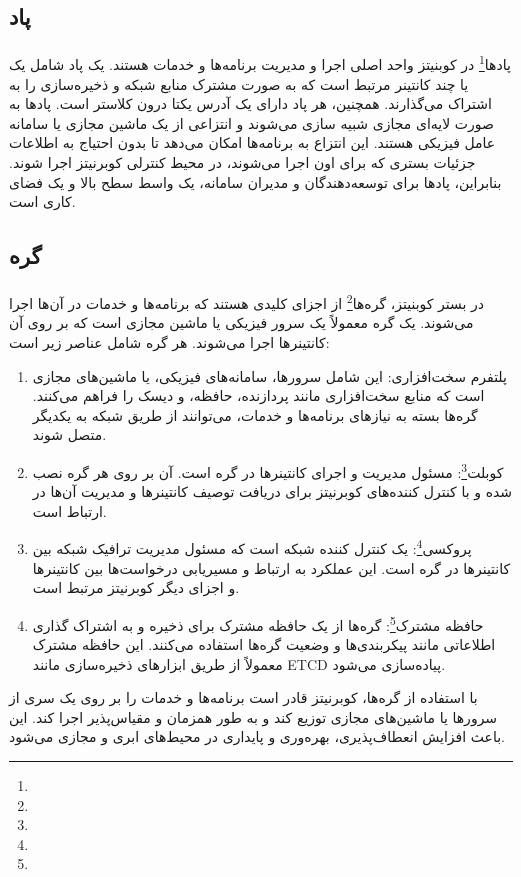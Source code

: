 \subsection{پاد}
\label{subsec:pod}
\paragraph{}
{
    پاد‌ها\footnote{} در کوبنیتز واحد اصلی اجرا و مدیریت برنامه‌ها و خدمات هستند. یک پاد شامل یک یا چند کانتینر مرتبط است که به صورت مشترک منابع شبکه و ذخیره‌سازی را به اشتراک می‌گذارند. همچنین، هر پاد دارای یک آدرس یکتا درون کلاستر است. پاد‌ها به صورت لایه‌ای مجازی شبیه سازی می‌شوند و انتزاعی از یک ماشین مجازی یا سامانه عامل فیزیکی هستند. این انتزاع به برنامه‌ها امکان می‌دهد تا بدون احتیاج به اطلاعات جزئیات بستری که برای اون اجرا می‌شوند، در محیط کنترلی کوبرنیتز اجرا شوند. بنابراین، پاد‌ها برای توسعه‌دهندگان و مدیران سامانه، یک واسط سطح بالا و یک فضای کاری است.
}

\subsection{گره}
\label{subsec:node}
\paragraph{}
{
    در بستر کوبنیتز، گره‌ها\footnote{} از اجزای کلیدی هستند که برنامه‌ها و خدمات در آن‌ها اجرا می‌شوند. یک گره 
    معمولاً یک سرور فیزیکی یا ماشین مجازی است که بر روی آن کانتینرها اجرا می‌شوند. هر گره شامل عناصر زیر است:
    \begin{enumerate}
        \item پلتفرم سخت‌افزاری: این شامل سرورها، سامانه‌های فیزیکی، یا ماشین‌های مجازی است که منابع سخت‌افزاری مانند پردازنده، حافظه، و دیسک را فراهم می‌کنند. گره‌ها بسته به نیازهای برنامه‌ها و خدمات، می‌توانند از طریق شبکه به یکدیگر متصل شوند.
        \item کوبلت\footnote{}: مسئول مدیریت و اجرای کانتینرها در گره است. آن بر روی هر گره نصب شده و با کنترل کننده‌های کوبرنیتز برای دریافت توصیف کانتینرها و مدیریت آن‌ها در ارتباط است.
        \item پروکسی\footnote{}: یک کنترل کننده شبکه است که مسئول مدیریت ترافیک شبکه بین کانتینرها در گره است. این عملکرد به ارتباط و مسیریابی درخواست‌ها بین کانتینرها و اجزای دیگر کوبرنیتز مرتبط است.
        \item حافظه مشترک\footnote{}: گره‌ها از یک حافظه مشترک برای ذخیره و به اشتراک گذاری اطلاعاتی مانند پیکربندی‌ها و وضعیت گره‌ها استفاده می‌کنند. این حافظه مشترک معمولاً از طریق ابزارهای ذخیره‌سازی مانند ETCD پیاده‌سازی می‌شود.
    \end{enumerate}
    با استفاده از گره‌ها، کوبرنیتز قادر است برنامه‌ها و خدمات را بر روی یک سری از سرورها یا ماشین‌های مجازی توزیع کند و به طور همزمان و مقیاس‌پذیر اجرا کند. این باعث افزایش انعطاف‌پذیری، بهره‌وری و پایداری در محیط‌های ابری و مجازی می‌شود.
}

